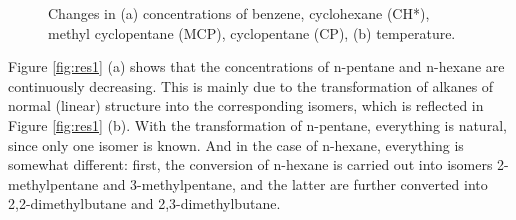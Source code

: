 \documentclass[mathematics,article,submit,pdftex,moreauthors]{Definitions/mdpi}
\begin{document}
\begin{figure}
\center
\begin{minipage}{0.45\linewidth}
\end{minipage}
\begin{minipage}{0.45\linewidth}
\end{minipage}
\caption{Changes in (a) concentrations of benzene, cyclohexane (CH*), methyl cyclopentane (MCP), cyclopentane (CP), (b) temperature.}\label{fig:res2}
\end{figure}  

Figure \ref{fig:res1} (a) shows that the concentrations of n-pentane and n-hexane are continuously decreasing. This is mainly due to the transformation of alkanes of normal (linear) structure into the corresponding isomers, which is reflected in Figure \ref{fig:res1} (b). With the transformation of n-pentane, everything is natural, since only one isomer is known. And in the case of n-hexane, everything is somewhat different: first, the conversion of n-hexane is carried out into isomers 2-methylpentane and 3-methylpentane, and the latter are further converted into 2,2-dimethylbutane and 2,3-dimethylbutane.
\end{document}
